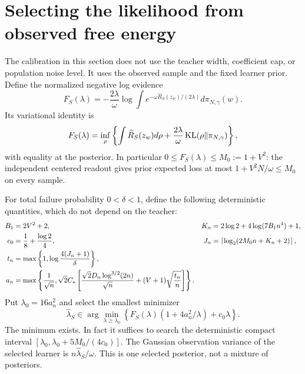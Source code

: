 \section{Selecting the likelihood from observed free energy}
The calibration in this section does not use the teacher width, coefficient cap, or population noise level. It uses the observed sample and the fixed learner prior. Define the normalized negative log evidence
\begin{equation}
 F_S(\lambda)=-\frac{2\lambda}{\omega}\log\int
       e^{-\omega\widehat R_S(z_w)/(2\lambda)}d\pi_{N,\gamma}(w).
 \label{eq:freeenergy-definition}
\end{equation}
Its variational identity is
\[
 F_S(\lambda)=\inf_\rho\left\{\int\widehat R_S(z_w)d\rho+
                    \frac{2\lambda}{\omega}\operatorname{KL}(\rho\|\pi_{N,\gamma})\right\},
\]
with equality at the posterior. In particular $0\le F_S(\lambda)\le M_0:=1+V^2$: the independent centered readout gives prior expected loss at most $1+V^2N/\omega\le M_0$ on every sample.

For total failure probability $0<\delta<1$, define the following deterministic quantities, which do not depend on the teacher:
\begin{align}
 B_1&=2V^2+2, & K_n&=2\log2+4\log(7B_1n^4)+1,\notag\\
 c_0&=\frac18+\frac{\log2}{4}, &
 J_n&=\left\lceil\log_2(2M_0n+K_n+2)\right\rceil,\notag\\
 t_n&=\max\left\{1,\log\frac{4(J_n+1)}\delta\right\},\notag\\
 a_n&=\max\left\{\frac1{\sqrt n},\sqrt2C_*\left[
       \frac{\sqrt2D_n\log^{3/2}(2n)}{\sqrt n}
                   +(V+1)\sqrt{\frac{t_n}n}\right]\right\}.
 \label{eq:adaptive-constants}
\end{align}
Put $\lambda_0=16a_n^2$ and select the smallest minimizer
\begin{equation}
 \widehat\lambda_S\in\arg\min_{\lambda\ge\lambda_0}
   \left\{F_S(\lambda)(1+4a_n^2/\lambda)+c_0\lambda\right\}.
 \label{eq:selected-lambda}
\end{equation}
The minimum exists. In fact it suffices to search the deterministic compact interval
$[\lambda_0,\lambda_0+5M_0/(4c_0)]$.
The Gaussian observation variance of the selected learner is
$n\widehat\lambda_S/\omega$. This is one selected posterior, not a mixture of posteriors.

